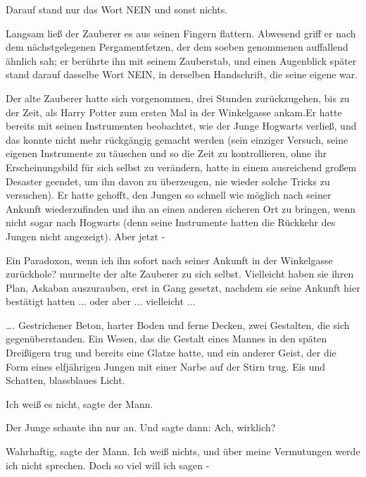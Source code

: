 Darauf stand nur das Wort \glqq{}NEIN\grqq{} und sonst nichts.

Langsam ließ der Zauberer es aus seinen Fingern flattern. Abwesend griff er nach
dem nächstgelegenen Pergamentfetzen, der dem soeben genommenen auffallend
ähnlich sah; er berührte ihn mit seinem Zauberstab, und einen Augenblick später
stand darauf dasselbe Wort \glqq{}NEIN\grqq{}, in derselben Handschrift, die
seine eigene war.

Der alte Zauberer hatte sich vorgenommen, drei Stunden zurückzugehen, bis zu der
Zeit, als Harry Potter zum ersten Mal in der Winkelgasse ankam.Er hatte bereits
mit seinen Instrumenten beobachtet, wie der Junge Hogwarts verließ, und das
konnte nicht mehr rückgängig gemacht werden (sein einziger Versuch, seine
eigenen Instrumente zu täuschen und so die Zeit zu kontrollieren, ohne ihr
Erscheinungsbild für sich selbst zu verändern, hatte in einem ausreichend großem
Desaster geendet, um ihn davon zu überzeugen, nie wieder solche Tricks zu
versuchen). Er hatte gehofft, den Jungen so schnell wie möglich nach seiner
Ankunft wiederzufinden und ihn an einen anderen sicheren Ort zu bringen, wenn
nicht sogar nach Hogwarts (denn seine Instrumente hatten die Rückkehr des Jungen
nicht angezeigt). Aber jetzt -

\glqq{}Ein Paradoxon, wenn ich ihn sofort nach seiner Ankunft in der Winkelgasse
zurückhole?\grqq{} murmelte der alte Zauberer zu sich selbst. \glqq{}Vielleicht
haben sie ihren Plan, Askaban auszurauben, erst in Gang gesetzt, nachdem sie
seine Ankunft hier bestätigt hatten ... oder aber ... vielleicht ...\grqq{}

…. Gestrichener Beton, harter Boden und ferne Decken, zwei Gestalten, die sich
gegenüberstanden. Ein Wesen, das die Gestalt eines Mannes in den späten
Dreißigern trug und bereits eine Glatze hatte, und ein anderer Geist, der die
Form eines elfjährigen Jungen mit einer Narbe auf der Stirn trug. Eis und
Schatten, blassblaues Licht.

\glqq{}Ich weiß es nicht\grqq{}, sagte der Mann.

Der Junge schaute ihn nur an. Und sagte dann: \glqq{}Ach, wirklich?\grqq{}

\glqq{}Wahrhaftig\grqq{}, sagte der Mann. \glqq{}Ich weiß nichts, und über meine
Vermutungen werde ich nicht sprechen. Doch so viel will ich sagen -\grqq{}


